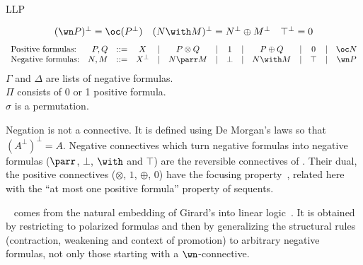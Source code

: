 \begin{entry}{LLP}
\begin{calculus}
\begin{center}
\[\begin{array}{c@{\quad}c@{\quad}c}
(\wn P)^\bot = \oc (P^\bot)
& (N\with M)^\bot = N^\bot\oplus M^\bot
& \top^\bot = 0
\end{array}
\]
\[
\begin{array}{lrlccccccccccc}
\textrm{Positive formulas:} & P,Q & ::= & X & \mid & P\otimes Q & \mid & 1 & \mid & P\oplus Q & \mid & 0 & \mid & \oc N \\
\textrm{Negative formulas:} & N,M & ::= & X^\bot & \mid & N\parr M & \mid & \bot & \mid & N\with M & \mid & \top & \mid & \wn P \\
\end{array}
\]
$\Gamma$ and $\Delta$ are lists of negative formulas.\\
$\Pi$ consists of 0 or 1 positive formula.\\
$\sigma$ is a permutation.
\end{center}
\end{calculus}


\begin{clarifications}
Negation is not a connective. It is defined using De Morgan's laws so that $(A^\bot)^\bot=A$.
Negative connectives which turn negative formulas into negative formulas ($\parr$, $\bot$, $\with$ and $\top$) are the reversible connectives of \LL{}.
Their dual, the positive connectives ($\otimes$, $1$, $\oplus$, $0$) have the focusing property~\cite{focal}, related here with the ``at most one positive formula'' property of sequents.
\end{clarifications}

\begin{history}
\LLP~\cite{phdlaurent} comes from the natural embedding of Girard's \LC{} into linear logic~. It is obtained by restricting \LL{} to polarized formulas and then by generalizing the structural rules (contraction, weakening and context of promotion) to arbitrary negative formulas, not only those starting with a $\wn$-connective.
\end{history}


\end{entry}
